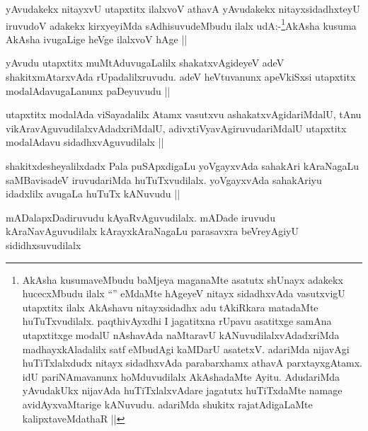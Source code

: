 
\begin{artha}
yAvudakekx nitayxvU utapxtitx ilalxvoV athavA yAvudakekx nitayxsidadhxteyU iruvudoV adakekx kirxyeyiMda sAdhisuvudeMbudu ilalx udA:-\footnote{AkAsha kusumaveMbudu baMjeya maganaMte asatutx shUnayx adakekx hucecxMbudu ilalx ``\stext'' eMdaMte hAgeyeV nitayx sidadhxvAda vasutxvigU utapxtitx ilalx AkAshavu nitayxsidadhx adu tAkiRkara matadaMte huTuTxvudilalx. paqthivAyxdhi I jagatitxna rUpavu asatitxge samAna utapxtitxge modalU nAshavAda naMtaravU kANuvudilalxvAdadxriMda madhayxkAladalilx satf eMbudAgi kaMDarU asatetxV. \stext adariMda nijavAgi huTiTxlalxdudx nitayx sidadhxvAda parabarxhamx athavA parxtayxgAtamx. idU pariNAmavanunx hoMduvudilalx AkAshadaMte Ayitu. AdudariMda yAvudakUkx nijavAda huTiTxlalxvAdare jagatutx huTiTxdaMte namage avidAyxvaMtarige kANuvudu. adariMda shukitx rajatAdigaLaMte kalipxtaveMdathaR ||}AkAsha kusuma AkAsha ivugaLige heVge ilalxvoV hAge ||
\end{artha}

\begin{artha}
yAvudu utapxtitx muMtAduvugaLalilx shakatxvAgideyeV adeV shakitxmAtarxvAda rUpadalilxruvudu. adeV heVtuvanunx apeVkiSxsi utapxtitx modalAdavugaLanunx paDeyuvudu ||
\end{artha}

\begin{artha}
utapxtitx modalAda viSayadalilx Atamx vasutxvu ashakatxvAgidariMdalU, tAnu vikAravAguvudilalxvAdadxriMdalU, adivxtiVyavAgiruvudariMdalU utapxtitx modalAdavu sidadhxvAguvudilalx ||
\end{artha}

\begin{artha}
shakitxdesheyalilxdadx Pala puSApxdigaLu yoVgayxvAda sahakAri kAraNagaLu saMBavisadeV iruvudariMda huTuTxvudilalx. yoVgayxvAda sahakAriyu idadxlilx avugaLa huTuTx kANuvudu ||
\end{artha}


\begin{artha}
mADalapxDadiruvudu kAyaRvAguvudilalx. mADade iruvudu  kAraNavAguvudilalx kArayxkAraNagaLu parasavxra beVreyAgiyU sididhxsuvudilalx
\end{artha}



